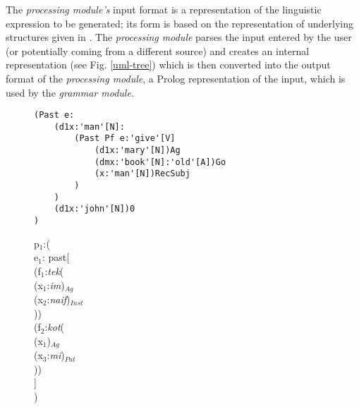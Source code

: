 \documentclass[a4paper, halfparskip, onecolumn, abstracton, final, figurecaptionabove]{scrartcl}
\begin{document}
The \emph{processing module's} input format is a representation of the linguistic expression to be generated; its form is based on the representation of underlying structures given in \cite{Dik1997a}. The \emph{processing module} parses the input entered by the user (or potentially coming from a different source) and creates an internal representation (see Fig. \ref{uml-tree}) which is then converted into the output format of the \emph{processing module}, a Prolog representation of the input, which is used by the \emph{grammar module}.

\begin{figure}
    \begin{center}

\begin{verbatim}
(Past e:
    (d1x:'man'[N]:
        (Past Pf e:'give'[V]
            (d1x:'mary'[N])Ag  
            (dmx:'book'[N]:'old'[A])Go
            (x:'man'[N])RecSubj
        )
    )
    (d1x:'john'[N])0
)
\end{verbatim}


\label{antlr-input}

    \end{center}
    \end{figure}
    
    \begin{figure}
     \begin{center}
  
\begin{tabbing}
p$_1$:(\=\\
	\> e$_1$: past[\=\\
		\>\>(f$_1$:\emph{tek}(\=\\
				\>\>\>(x$_1$:\emph{im})$_{Ag}$\\
				\>\>\>(x$_2$:\emph{naif})$_{Inst}$\\
				\>\>))\\ 
		\>\>(f$_2$:\emph{kot}(\\
				\>\>\>(x$_1$)$_{Ag}$\\
				\>\>\>(x$_3$:\emph{mi})$_{Pat}$\\
				\>\>))\\
				\>]\\
				) 
\end{tabbing}


\label{fdg-rl}  
\end{center}
\end{figure}
\end{document}
